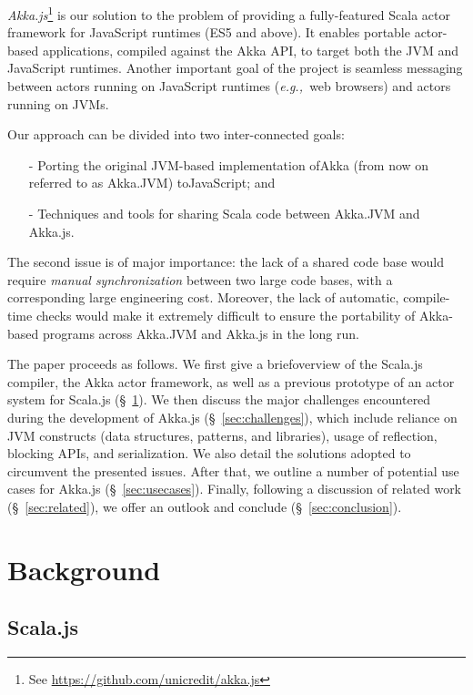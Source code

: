 \documentclass{sig-alternate}
\newcommand{\eg}{{\em e.g.,~}}
\begin{document}
{\em Akka.js}\footnote{See \url{https://github.com/unicredit/akka.js}} is our solution to the problem of providing a fully-featured Scala actor framework for JavaScript runtimes (ES5 and above). It enables portable actor-based applications, compiled against the Akka API, to target both the JVM and JavaScript runtimes. Another important goal of the project is seamless messaging between actors running on JavaScript runtimes (\eg web browsers) and actors running on JVMs.

Our approach can be divided into two inter-connected goals:
\begin{itemize}
	\item[-] Porting the original JVM-based implementation of\newline Akka (from now on referred to as Akka.JVM) to\newline JavaScript; and
	\item[-] Techniques and tools for sharing Scala code between Akka.JVM and Akka.js.
\end{itemize}
\noindent
The second issue is of major importance: the lack of a shared code base would require {\em manual synchronization} between two large code bases, with a corresponding large engineering cost. Moreover, the lack of automatic, compile-time checks would make it extremely difficult to ensure the portability of Akka-based programs across Akka.JVM and Akka.js in the long run.

The paper proceeds as follows. We first give a brief\newline overview of the Scala.js compiler, the Akka actor framework, as well as a previous prototype of an actor system for Scala.js (\S~\ref{sec:background}). We then discuss the major challenges encountered during the development of Akka.js (\S~\ref{sec:challenges}), which include reliance on JVM constructs (data structures, patterns, and libraries), usage of reflection, blocking APIs, and serialization. We also detail the solutions adopted to circumvent the presented issues. After that, we outline a number of potential use cases for Akka.js (\S~\ref{sec:usecases}). Finally, following a discussion of related work (\S~\ref{sec:related}), we offer an outlook and conclude (\S~\ref{sec:conclusion}).

\section{Background}\label{sec:background}

\subsection{Scala.js}
\end{document}
